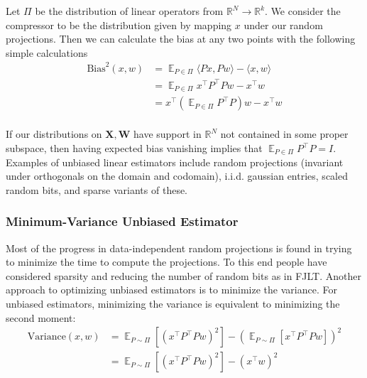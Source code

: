 \documentclass{article}
\theoremstyle{definition}
\theoremstyle{plain}
\newcommand{\R}{\mathbb{R}}
\DeclareMathOperator{\E}{\mathbb{E}}
\begin{document}
Let $\Pi$ be the distribution of linear operators from $\R^N \to \R^k$. We consider the compressor to be the distribution given by mapping $x$ under our random projections. Then we can calculate the bias at any two points with the following simple calculations
\begin{align*}\text{Bias}^2(x,w) &= \E_{P \in \Pi} \langle Px, Pw \rangle - \langle x, w \rangle\\
&= \E_{P \in \Pi} x^\top P^\top P w - x^\top w\\ 
&= x^\top (\E_{P \in \Pi} P^\top P) w - x^\top w\\ 
\end{align*}

If our distributions on $\mathbf{X}, \mathbf{W}$ have support in $\R^N$ not contained in some proper subspace, then having expected bias vanishing implies that $\E_{P \in \Pi} P^\top P = I$. Examples of unbiased linear estimators include random projections (invariant under orthogonals on the domain and codomain), i.i.d. gaussian entries, scaled random bits, and sparse variants of these.



\subsubsection*{Minimum-Variance Unbiased Estimator}
Most of the progress in data-independent random projections is found in trying to minimize the time to compute the projections. To this end people have considered sparsity and reducing the number of random bits as in FJLT. Another approach to optimizing unbiased estimators is to minimize the variance. For unbiased estimators, minimizing the variance is equivalent to minimizing the second moment:
\begin{align*}\text{Variance}(x,w) &= \E_{P \sim \Pi} [ (x^\top P^\top P w)^2 ] - (\E_{P \sim \Pi} [x^\top P^\top P w])^2 \\
&=\E_{P \sim \Pi} [ (x^\top P^\top P w)^2 ] - (x^\top w)^2 \\
\end{align*}
\end{document}
